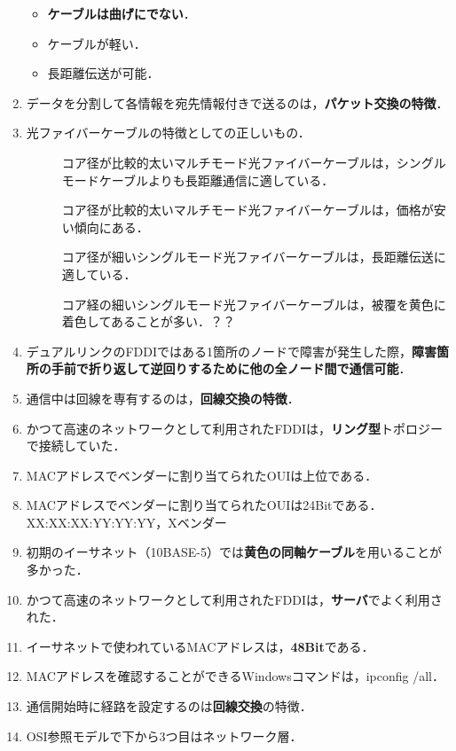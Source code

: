 \documentclass[paper=a4,10pt,twocolumn]{jlreq}
\begin{document}
\begin{enumerate}
\begin{itemize}
              \item \textbf{ケーブルは曲げにでない}．
              \item ケーブルが軽い．
              \item 長距離伝送が可能．
          \end{itemize}
    \item データを分割して各情報を宛先情報付きで送るのは，\textbf{パケット交換の特徴}．
    \item 光ファイバーケーブルの特徴としての正しいもの．
          \begin{description}
              \item[\bt] コア径が比較的太いマルチモード光ファイバーケーブルは，シングルモードケーブルよりも長距離通信に適している．
              \item[\bt] コア径が比較的太いマルチモード光ファイバーケーブルは，価格が安い傾向にある．
              \item[\ci] コア径が細いシングルモード光ファイバーケーブルは，長距離伝送に適している．
              \item[\bt] コア経の細いシングルモード光ファイバーケーブルは，被覆を黄色に着色してあることが多い．？？
          \end{description}
    \item デュアルリンクのFDDIではある1箇所のノードで障害が発生した際，\textbf{障害箇所の手前で折り返して逆回りするために他の全ノード間で通信可能}．
    \item 通信中は回線を専有するのは，\textbf{回線交換の特徴}．
    \item かつて高速のネットワークとして利用されたFDDIは，\textbf{リング型}トポロジーで接続していた．
    \item MACアドレスでベンダーに割り当てられたOUIは上位である．
    \item MACアドレスでベンダーに割り当てられたOUIは24Bitである．{\ttfamily XX:XX:XX:YY:YY:YY，X}ベンダー
    \item 初期のイーサネット（10BASE-5）では\textbf{黄色の同軸ケーブル}を用いることが多かった．
    \item かつて高速のネットワークとして利用されたFDDIは，\textbf{サーバ}でよく利用された．
    \item イーサネットで使われているMACアドレスは，\textbf{48Bit}である．
    \item MACアドレスを確認することができるWindowsコマンドは，{\ttfamily ipconfig /all}．
    \item 通信開始時に経路を設定するのは\textbf{回線交換}の特徴．
    \item OSI参照モデルで下から3つ目はネットワーク層．

\end{enumerate}
\end{document}
